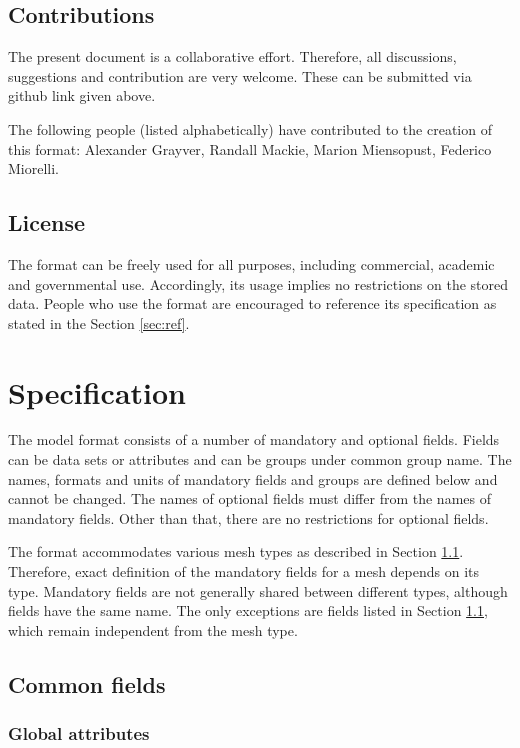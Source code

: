 \documentclass[10pt,a4paper]{article}
\begin{document}
\subsection{Contributions}

The present document is a collaborative effort. Therefore, all discussions, suggestions and contribution are very welcome. These can be submitted via github link given above. 

The following people (listed alphabetically) have contributed to the creation of this format: Alexander Grayver, Randall Mackie, Marion Miensopust, Federico Miorelli.

\subsection{License}

The format can be freely used for all purposes, including commercial, academic and governmental use. Accordingly, its usage implies no restrictions on the stored data. People who use the format are encouraged to reference its specification as stated in the Section \ref{sec:ref}.

\section{Specification}

The model format consists of a number of mandatory and optional fields. Fields can be data sets or attributes and can be groups under common group name. The names, formats and units of mandatory fields and groups are defined below and cannot be changed. The names of optional fields must differ from the names of mandatory fields. Other than that, there are no restrictions for optional fields.

The format accommodates various mesh types as described in Section \ref{sec:common}. Therefore, exact definition of the mandatory fields for a mesh depends on its type. Mandatory fields are not generally shared between different types, although fields have the same name. The only exceptions are fields listed in Section \ref{sec:common}, which remain independent from the mesh type.

\subsection{Common fields}
\label{sec:common}

\subsubsection{Global attributes}
\end{document}
